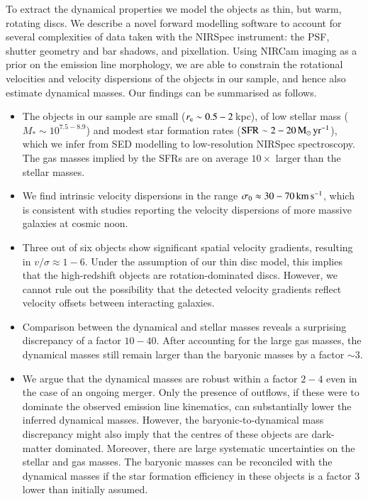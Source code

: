 \documentclass[longauth]{aa}
\newcommand{\kms}{\rm km\,s^{-1}}
\newcommand{\Msun}{\rm M_\odot}
\newcommand{\re}{r_{\rm e}}
\newcommand{\vdisp}{\sigma_0}
\begin{document}
To extract the dynamical properties we model the objects as thin, but warm, rotating discs. We describe a novel forward modelling software to account for several complexities of data taken with the NIRSpec instrument: the PSF, shutter geometry and bar shadows, and pixellation. Using NIRCam imaging as a prior on the emission line morphology, we are able to constrain the rotational velocities and velocity dispersions of the objects in our sample, and hence also estimate dynamical masses. Our findings can be summarised as follows. 

\begin{itemize}
    \item The objects in our sample are small ($\re\sim 0.5 - 2\,$kpc), of low stellar mass ($M_*\sim 10^{7.5-8.9}$) and modest star formation rates ($\rm SFR\sim 2-20\,\Msun\,yr^{-1}$), which we infer from SED modelling to low-resolution NIRSpec spectroscopy. The gas masses implied by the SFRs are on average $10\times$ larger than the stellar masses.
    \item We find intrinsic velocity dispersions in the range $\vdisp\approx 30-70\,\kms$, which is consistent with studies reporting the velocity dispersions of more massive galaxies at cosmic noon. 
    \item Three out of six objects show significant spatial velocity gradients, resulting in $v/\sigma\approx 1-6$. Under the assumption of our thin disc model, this implies that the high-redshift objects are rotation-dominated discs. However, we cannot rule out the possibility that the detected velocity gradients reflect velocity offsets between interacting galaxies.
    \item Comparison between the dynamical and stellar masses reveals a surprising discrepancy of a factor $10-40$. 
    After accounting for the large gas masses, the dynamical masses still remain larger than the baryonic masses by a factor $\sim3$. 
    \item We argue that the dynamical masses are robust within a factor $2-4$ even in the case of an ongoing merger. Only the presence of outflows, if these were to dominate the observed emission line kinematics, can substantially lower the inferred dynamical masses. However, the baryonic-to-dynamical mass discrepancy might also imply that the centres of these objects are dark-matter dominated. Moreover, there are large systematic uncertainties on the stellar and gas masses. The baryonic masses can be reconciled with the dynamical masses if the star formation efficiency in these objects is a factor 3 lower than initially assumed.

    
\end{itemize}
\end{document}
